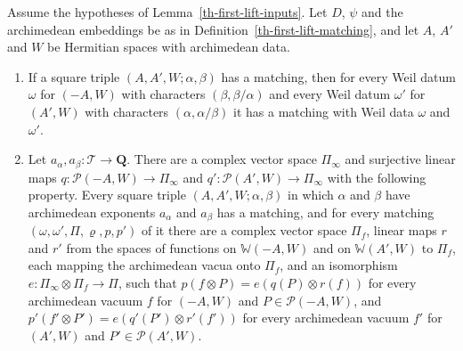 \begin{lemma}\label{th-first-lift-factor}
Assume the hypotheses of Lemma~\ref{th-first-lift-inputs}. Let $D$, $\psi$
and the archimedean embeddings be as in
Definition~\ref{th-first-lift-matching}, and let $A$, $A'$ and $W$ be Hermitian
spaces with archimedean data.
\begin{enumerate}
\item If a square triple $(A,A',W;\alpha,\beta)$ has a matching, then for every
  Weil datum $\omega$ for $(-A,W)$ with characters $(\beta,\beta/\alpha)$ and
  every Weil datum $\omega'$ for $(A',W)$ with characters
  $(\alpha,\alpha/\beta)$ it has a matching with Weil data $\omega$ and
  $\omega'$.
\item Let $a_\alpha,a_\beta\colon\mathcal T\to\mathbf Q$. There are a complex
  vector space $\Pi_\infty$ and surjective linear maps
  $q\colon\mathcal P(-A,W)\to\Pi_\infty$ and
  $q'\colon\mathcal P(A',W)\to\Pi_\infty$ with the following property. Every
  square triple $(A,A',W;\alpha,\beta)$ in which $\alpha$ and $\beta$ have
  archimedean exponents $a_\alpha$ and $a_\beta$ has a matching, and for every
  matching $(\omega,\omega',\Pi,\varrho,p,p')$ of it there are a complex vector
  space $\Pi_f$, linear maps $r$ and $r'$ from the spaces of functions on
  $\mathbb W(-A,W)$ and on $\mathbb W(A',W)$ to $\Pi_f$, each mapping the
  archimedean vacua onto $\Pi_f$, and an isomorphism
  $e\colon\Pi_\infty\otimes\Pi_f\to\Pi$, such that
  $p(f\otimes P)=e(q(P)\otimes r(f))$ for every archimedean vacuum $f$ for
  $(-A,W)$ and $P\in\mathcal P(-A,W)$, and
  $p'(f'\otimes P')=e(q'(P')\otimes r'(f'))$ for every archimedean vacuum $f'$
  for $(A',W)$ and $P'\in\mathcal P(A',W)$.
\end{enumerate}
\end{lemma}
